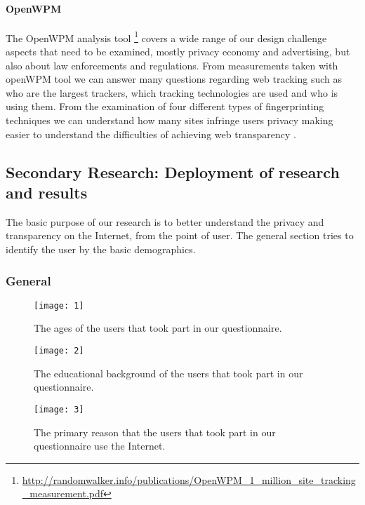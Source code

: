 \paragraph{OpenWPM}

The OpenWPM analysis tool 
\footnote{\url{http://randomwalker.info/publications/OpenWPM\_1\_million\_site\_tracking\_measurement.pdf}} 
covers a wide range of our design challenge aspects that need to be examined, 
mostly privacy economy and advertising, but also about law enforcements and 
regulations. From measurements taken with openWPM tool we can answer many 
questions regarding web tracking such as who are the largest trackers, which 
tracking technologies are used and who is using them. From the examination of 
four different types of fingerprinting techniques we can understand how many 
sites infringe users privacy making easier to understand the difficulties of 
achieving web transparency \cite{trade, wall}.

\subsection{Secondary Research: Deployment of research and results}

The basic purpose of our research is to better understand  the privacy and 
transparency on the Internet, from the point of  user.
The general section tries to identify the user by the basic demographics.

\subsubsection{General}

\begin{figure}[hp]
\centering
\texttt{[image: 1]}
\caption{The ages of the users that took part in our questionnaire.}
\end{figure}

\begin{figure}[hp]
\centering
\texttt{[image: 2]}
\caption{The educational background of the users that took part in our 
questionnaire.}
\end{figure}

\begin{figure}[hp]
\centering
\texttt{[image: 3]}
\caption{The primary reason that the users that took part in our questionnaire 
use the Internet.}
\end{figure}

